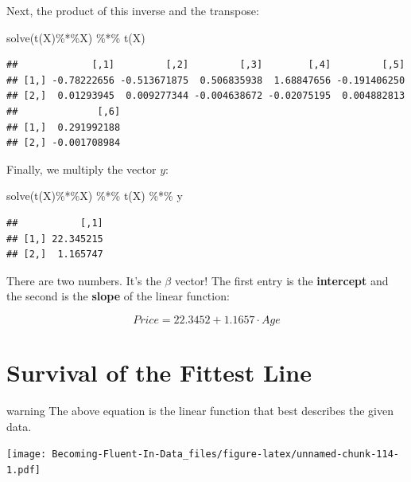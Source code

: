 \documentclass[
]{book}
\newenvironment{Shaded}{\begin{snugshade}}{\end{snugshade}}
\newcommand{\FunctionTok}[1]{\textcolor[rgb]{0.00,0.00,0.00}{#1}}
\newcommand{\NormalTok}[1]{#1}
\newcommand{\SpecialCharTok}[1]{\textcolor[rgb]{0.00,0.00,0.00}{#1}}
\begin{document}
Next, the product of this inverse and the transpose:

\begin{Shaded}
\begin{Highlighting}[]
\FunctionTok{solve}\NormalTok{(}\FunctionTok{t}\NormalTok{(X)}\SpecialCharTok{\%*\%}\NormalTok{X) }\SpecialCharTok{\%*\%} \FunctionTok{t}\NormalTok{(X)}
\end{Highlighting}
\end{Shaded}

\begin{verbatim}
##             [,1]         [,2]         [,3]        [,4]         [,5]
## [1,] -0.78222656 -0.513671875  0.506835938  1.68847656 -0.191406250
## [2,]  0.01293945  0.009277344 -0.004638672 -0.02075195  0.004882813
##              [,6]
## [1,]  0.291992188
## [2,] -0.001708984
\end{verbatim}

Finally, we multiply the vector \(y\):

\begin{Shaded}
\begin{Highlighting}[]
\FunctionTok{solve}\NormalTok{(}\FunctionTok{t}\NormalTok{(X)}\SpecialCharTok{\%*\%}\NormalTok{X) }\SpecialCharTok{\%*\%} \FunctionTok{t}\NormalTok{(X) }\SpecialCharTok{\%*\%}\NormalTok{ y}
\end{Highlighting}
\end{Shaded}

\begin{verbatim}
##           [,1]
## [1,] 22.345215
## [2,]  1.165747
\end{verbatim}

There are two numbers. It's the \(\beta\) vector! The first entry is the \textbf{intercept} and the second is the \textbf{slope} of the linear function:

\[Price = 22.3452 + 1.1657 \cdot Age\]

\hypertarget{survival-of-the-fittest-line}{%
\section{Survival of the Fittest Line}\label{survival-of-the-fittest-line}}

\begin{infobox}warning
The above equation is the linear function that best describes the given data.

\end{infobox}

\texttt{[image: Becoming-Fluent-In-Data\_files/figure-latex/unnamed-chunk-114-1.pdf]}
\end{document}

